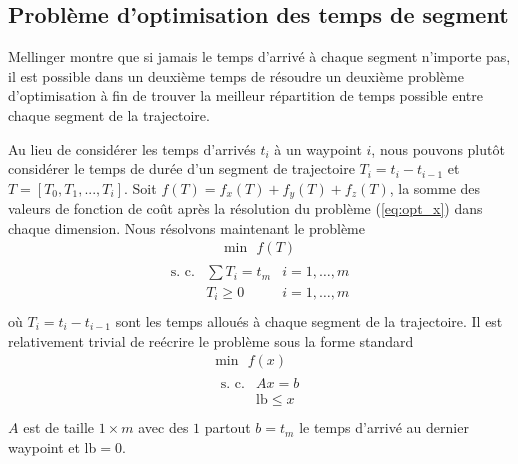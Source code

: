 \subsection{Problème d'optimisation des temps de segment}

Mellinger montre que si jamais le temps d'arrivé à chaque segment n'importe pas, il est possible dans un deuxième temps de résoudre un deuxième problème d'optimisation à fin de trouver la meilleur répartition de temps possible entre chaque segment de la trajectoire.

Au lieu de considérer les temps d'arrivés $t_i$ à un waypoint $i$, nous pouvons plutôt considérer le temps de durée d'un segment de trajectoire $T_i = t_i - t_{i-1}$ et $T = [T_0, T_1, ..., T_i]$. Soit $f(T) = f_x(T) +  f_y(T) + f_z(T)$, la somme des valeurs de fonction de coût après la résolution du problème (\ref{eq:opt_x}) dans chaque dimension. Nous résolvons maintenant le problème
\begin{align}\label{eq:time_opt}
\text{min}\ \ \ f(T)
\end{align}\begin{align*}
\begin{array}{lll}
\text{s. c.} & \sum T_i = t_m & i = 1,\ldots,m\\
& T_i \geq 0 &  i = 1,\ldots,m\\
\end{array}
\end{align*}
où $T_i = t_i - t_{i-1}$ sont les temps alloués à chaque segment de la trajectoire. Il est relativement trivial de reécrire le problème sous la forme standard
\begin{align*}
\text{min}\ \ \ f(x)\\
\begin{array}{lll}
\text{s. c.} & Ax = b\\
& \text{lb} \leq x\\
\end{array}
\end{align*}
$A$ est de taille $1 \times m$ avec des $1$ partout $b = t_m$ le temps d'arrivé au dernier waypoint et lb$=0$. 

